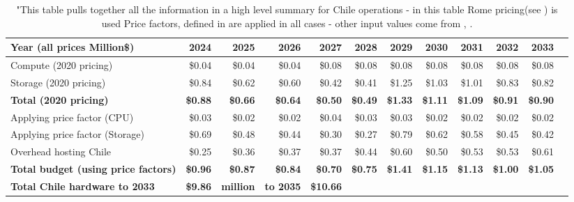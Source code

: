 \tiny \begin{longtable} { |p{}  |r  |r  |r  |r  |r  |r  |r  |r  |r  |r  |r |} 
\caption{"This table pulls together all the information in a high level summary 
for Chile operations - in this table Rome pricing(see 
) is used  Price factors, defined in 
 are applied in all cases - other input values come 
from , . \label{tab:opsChileR}}\\ 
\hline 
\textbf{Year  (all prices Million\$)}&\textbf{2024}&\textbf{2025}&\textbf{2026}&\textbf{2027}&\textbf{2028}&\textbf{2029}&\textbf{2030}&\textbf{2031}&\textbf{2032}&\textbf{2033} \\ \hline
{Compute (2020 pricing)}&{\$0.04}&{\$0.04}&{\$0.04}&{\$0.08}&{\$0.08}&{\$0.08}&{\$0.08}&{\$0.08}&{\$0.08}&{\$0.08} \\ \hline
{Storage (2020 pricing)}&{\$0.84}&{\$0.62}&{\$0.60}&{\$0.42}&{\$0.41}&{\$1.25}&{\$1.03}&{\$1.01}&{\$0.83}&{\$0.82} \\ \hline
\textbf{Total (2020 pricing)}&\textbf{\$0.88}&\textbf{\$0.66}&\textbf{\$0.64}&\textbf{\$0.50}&\textbf{\$0.49}&\textbf{\$1.33}&\textbf{\$1.11}&\textbf{\$1.09}&\textbf{\$0.91}&\textbf{\$0.90} \\ \hline
{Applying price factor (CPU)}&{\$0.03}&{\$0.02}&{\$0.02}&{\$0.04}&{\$0.03}&{\$0.03}&{\$0.02}&{\$0.02}&{\$0.02}&{\$0.02} \\ \hline
{Applying price factor (Storage)}&{\$0.69}&{\$0.48}&{\$0.44}&{\$0.30}&{\$0.27}&{\$0.79}&{\$0.62}&{\$0.58}&{\$0.45}&{\$0.42} \\ \hline
{Overhead hosting Chile}&{\$0.25}&{\$0.36}&{\$0.37}&{\$0.37}&{\$0.44}&{\$0.60}&{\$0.50}&{\$0.53}&{\$0.53}&{\$0.61} \\ \hline
\textbf{Total budget (using price factors)}&\textbf{\$0.96}&\textbf{\$0.87}&\textbf{\$0.84}&\textbf{\$0.70}&\textbf{\$0.75}&\textbf{\$1.41}&\textbf{\$1.15}&\textbf{\$1.13}&\textbf{\$1.00}&\textbf{\$1.05} \\ \hline
\textbf{Total Chile hardware to 2033}&\textbf{\$9.86}&\textbf{million}&\textbf{to 2035}&\textbf{\$10.66}&&&&&& \\ \hline
\end{longtable} \normalsize

